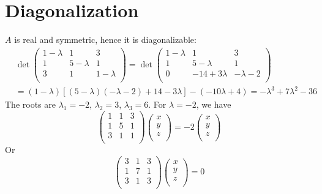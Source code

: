 \documentclass{article}
\begin{document}
\section{Diagonalization}
$A$ is real and symmetric, hence it is diagonalizable:
\begin{align*}
    &\det\left( \begin{array}{ccc}
     1-\lambda & 1 & 3 \\
     1 & 5-\lambda & 1 \\
     3 & 1 & 1-\lambda \\
    \end{array} \right) = 
    \det\left( \begin{array}{ccc}
     1-\lambda & 1 & 3 \\
     1 & 5-\lambda & 1 \\
     0 & -14+3\lambda & -\lambda-2 \\
        \end{array} \right)\\
     &=(1-\lambda)\left[(5-\lambda)(-\lambda-2)+14-3\lambda\right]
        -(-10\lambda+4)
        = -\lambda^3+7\lambda^2 -36
\end{align*}
The roots are $\lambda_1 = -2$, $\lambda_2=3$, $\lambda_3=6$.
For $\lambda=-2$, we have
$$
\left( \begin{array}{ccc}
 1 & 1 & 3 \\
 1 & 5 & 1 \\
 3 & 1 & 1 \\
\end{array} \right)\left( \begin{array}{c}
 x \\
 y \\
 z \\
\end{array} \right) = 
-2\left( \begin{array}{c}
 x \\
 y \\
 z \\
\end{array} \right)
$$
Or
$$
\left( \begin{array}{ccc}
 3 & 1 & 3 \\
 1 & 7 & 1 \\
 3 & 1 & 3 \\
\end{array} \right)\left( \begin{array}{c}
 x \\
 y \\
 z \\
\end{array} \right) = 0
$$
\end{document}
